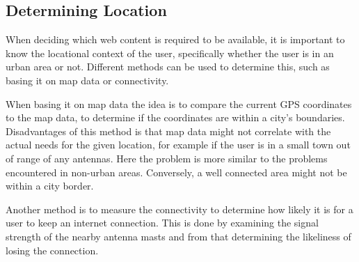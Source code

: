 \subsection{Determining Location}


When deciding which web content is required to be available, it is important to know the locational context of the user, specifically whether the user is in an urban area or not. Different methods can be used to determine this, such as basing it on map data or connectivity.

When basing it on map data the idea is to compare the current GPS coordinates to the map data, to determine if the coordinates are within a city's boundaries. Disadvantages of this method is that map data might not correlate with the actual needs for the given location, for example if the user is in a small town out of range of any antennas. Here the problem is more similar to the problems encountered in non-urban areas. Conversely, a well connected area might not be within a city border.

Another method is to measure the connectivity to determine how likely it is for a user to keep an internet connection. This is done by examining the signal strength of the nearby antenna masts and from that determining the likeliness of losing the connection.   
